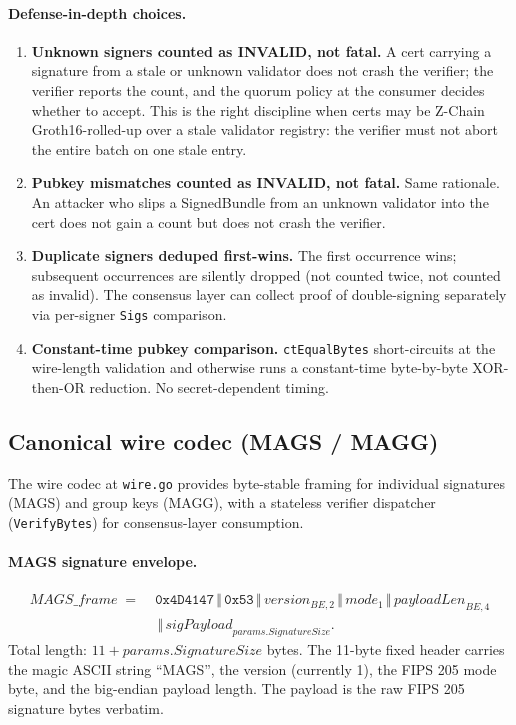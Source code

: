 \paragraph{Defense-in-depth choices.}
\begin{enumerate}[leftmargin=2em,nosep]
  \item \textbf{Unknown signers counted as INVALID, not fatal.} A
        cert carrying a signature from a stale or unknown validator
        does not crash the verifier; the verifier reports the
        count, and the quorum policy at the consumer decides
        whether to accept. This is the right discipline when certs
        may be Z-Chain Groth16-rolled-up over a stale validator
        registry: the verifier must not abort the entire batch on
        one stale entry.
  \item \textbf{Pubkey mismatches counted as INVALID, not fatal.}
        Same rationale. An attacker who slips a SignedBundle from
        an unknown validator into the cert does not gain a count
        but does not crash the verifier.
  \item \textbf{Duplicate signers deduped first-wins.} The first
        occurrence wins; subsequent occurrences are silently
        dropped (not counted twice, not counted as invalid). The
        consensus layer can collect proof of double-signing
        separately via per-signer \texttt{Sigs} comparison.
  \item \textbf{Constant-time pubkey comparison.}
        \texttt{ctEqualBytes} short-circuits at the wire-length
        validation and otherwise runs a constant-time
        byte-by-byte XOR-then-OR reduction. No secret-dependent
        timing.
\end{enumerate}

\subsection{Canonical wire codec (MAGS / MAGG)}
\label{sec:construction:wire}

The wire codec at \texttt{wire.go} provides byte-stable framing for
individual signatures (MAGS) and group keys (MAGG), with a stateless
verifier dispatcher (\texttt{VerifyBytes}) for consensus-layer
consumption.

\paragraph{MAGS signature envelope.}
\begin{align*}
  \mathit{MAGS\_frame} \;=\; & \mathtt{0x4D4147} \,\Vert\,
    \mathtt{0x53} \,\Vert\, \mathit{version}_{\mathit{BE},2} \,\Vert\,
    \mathit{mode}_1 \,\Vert\, \mathit{payloadLen}_{\mathit{BE},4} \\
  & \,\Vert\, \mathit{sigPayload}_{params.SignatureSize}.
\end{align*}
Total length: $11 + params.SignatureSize$ bytes. The 11-byte fixed
header carries the magic ASCII string ``MAGS'', the version
(currently 1), the FIPS 205 mode byte, and the big-endian payload
length. The payload is the raw FIPS 205 signature bytes verbatim.

